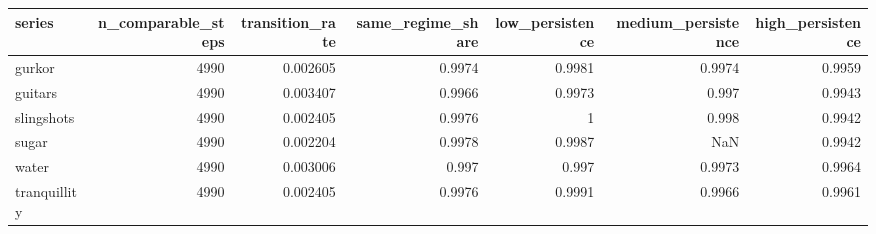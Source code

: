 \begin{tabular}{lrrrrrr}
\toprule
series & n_comparable_steps & transition_rate & same_regime_share & low_persistence & medium_persistence & high_persistence \\
\midrule
gurkor & 4990 & 0.002605 & 0.9974 & 0.9981 & 0.9974 & 0.9959 \\
guitars & 4990 & 0.003407 & 0.9966 & 0.9973 & 0.997 & 0.9943 \\
slingshots & 4990 & 0.002405 & 0.9976 & 1 & 0.998 & 0.9942 \\
sugar & 4990 & 0.002204 & 0.9978 & 0.9987 & NaN & 0.9942 \\
water & 4990 & 0.003006 & 0.997 & 0.997 & 0.9973 & 0.9964 \\
tranquillity & 4990 & 0.002405 & 0.9976 & 0.9991 & 0.9966 & 0.9961 \\
\bottomrule
\end{tabular}
